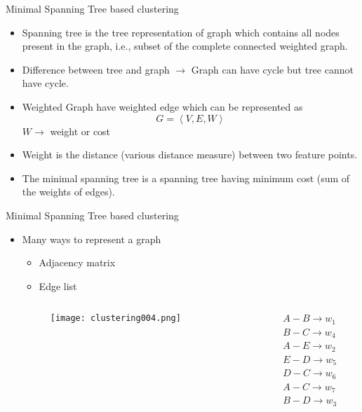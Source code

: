 \begin{frame}{Minimal Spanning Tree based clustering}
\begin{itemize}
\item Spanning tree is the tree representation of graph which contains all nodes present in the graph, i.e., subset of the complete connected weighted graph.
\item Difference between tree and graph $\rightarrow$ Graph can have cycle but tree cannot have cycle.
\item Weighted Graph have weighted edge which can be represented as
\begin{equation}
G = \left\langle {V,E,W} \right\rangle \nonumber
\end{equation}
$W\rightarrow$ weight or cost
\item Weight is the distance (various distance measure) between two feature points.
\item The minimal spanning tree is a spanning tree having minimum cost (sum of the weights of edges).
\end{itemize}
\end{frame}

\begin{frame}{Minimal Spanning Tree based clustering}
\begin{itemize}
\item Many ways to represent a graph
\begin{itemize}
\item Adjacency matrix
\item Edge list
\end{itemize}
\begin{columns}
\begin{column}{5cm}
\begin{figure}
\texttt{[image: clustering004.png]}
\end{figure}
\end{column}
\begin{column}{5cm}
\begin{align}
A-B \rightarrow w_1\nonumber\\
B-C \rightarrow w_4\nonumber\\
A-E \rightarrow w_2\nonumber\\
E-D \rightarrow w_5\nonumber\\
D-C \rightarrow w_6\nonumber\\
A-C \rightarrow w_7\nonumber\\
B-D \rightarrow w_3\nonumber
\end{align}
\end{column}
\end{columns}
\end{itemize}
\end{frame}

